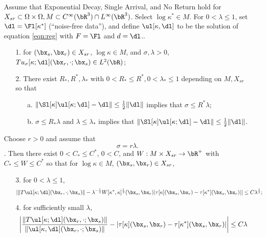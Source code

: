 \begin{theorem}
  \label{thm:main}
  Assume that Exponential Decay, Single Arrival, and No Return
  hold for $X_{sr} \subset \Omega \times \Omega, M \subset C^{\infty}(\bR^3) \cap L^{\infty}(\bR^3)$.
  Select $\log \kappa^* \in M$. For $0 <
  \lambda \le 1$, set
  $\dl=\Fl[\kappa^*]$ (``noise-free data''), and  define $\ul[\kappa,\dl]$
  to be the solution of 
  equation \ref{eqn:reg} with $F=\Fl$ and $d=\dl$..
  
  \begin{itemize}
  \item[1. ] for $(\bx_s,\bx_r) \in X_{sr}$, $\log \kappa \in M$, and
    $\sigma, \lambda >0$, $Tu_{\sigma}[\kappa;\dl](\bx_r,\cdot;\bx_s) \in
    L^2(\bR)$;
  \item[2. ] There exist $R_*,R^*,\lambda_*$ with $0<R_*\le R^*, 0 <
    \lambda_*\le 1$ depending on
    $M, X_{sr}$ so that
    \begin{itemize}
    \item[a. ] $\|\Sl[\kappa]\ul[\kappa;\dl]-\dl\| \le
      \frac{1}{2}\|\dl\|$ implies that $\sigma \le R^*\lambda$;
    \item[b. ] $\sigma \le R_*\lambda$ and $\lambda \le \lambda_*$
      implies that $\|\Sl[\kappa]\ul[\kappa;\dl]-\dl\| \le
      \frac{1}{2}\|\dl\|$.
    \end{itemize}
  \end{itemize}
  Choose $r > 0$ and assume that
  \begin{equation}
    \label{eqn:lamsig}
    \sigma = r \lambda.
  \end{equation}.
  Then there exist $0 < C_* \le C^*$, $0 < C$, and $W: M \times X_{sr}
  \rightarrow \bR^+$ with $C_* \le
  W \le C^*$ so that for
  $\log \kappa \in M$, $(\bx_s,\bx_r) \in X_{sr}$,
  \begin{itemize}
  \item[3. ] for $0 <  \lambda \le 1$, 
    \begin{equation}
      \label{eqn:mswitt}
      |\|T\ul[\kappa;\dl](\bx_r,\cdot;\bx_s)\|- \lambda^{-\frac{1}{2}} W[\kappa^*,\kappa]^{\frac{1}{2}}(\bx_s,\bx_r)|\tau[\kappa](\bx_s,\bx_r)-\tau[\kappa^*](\bx_s,\bx_r)|| \le C
      \lambda^{\frac{1}{2}};
    \end{equation}
  \item[4. ]for sufficiently small $\lambda$, 
    \begin{equation}
      \label{eqn:awitt}
      \left|\frac{\|T\ul[\kappa;\dl](\bx_r,\cdot;\bx_s)\|}{\|\ul[\kappa,\dl](\bx_r,\cdot;\bx_s)\|}-
        |\tau[\kappa](\bx_s,\bx_r)-\tau[\kappa^*](\bx_s,\bx_r)|\right| \le C \lambda
    \end{equation}
  \end{itemize}
\end{theorem}
